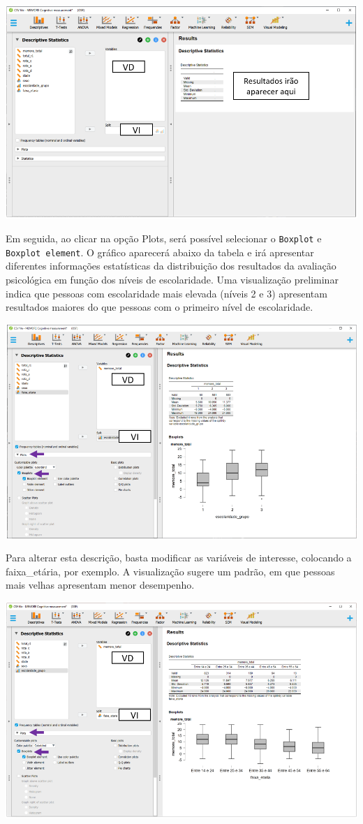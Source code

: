 \documentclass[
]{book}
\begin{document}
\includegraphics{./img/cap_anova_two_way_descriptives2.png}

Em seguida, ao clicar na opção Plots, será possível selecionar o
\texttt{Boxplot} e \texttt{Boxplot\ element}. O gráfico aparecerá abaixo
da tabela e irá apresentar diferentes informações estatísticas da
distribuição dos resultados da avaliação psicológica em função dos
níveis de escolaridade. Uma visualização preliminar indica que pessoas
com escolaridade mais elevada (níveis 2 e 3) apresentam resultados
maiores do que pessoas com o primeiro nível de escolaridade.

\includegraphics{./img/cap_anova_two_way_plot.png}

Para alterar esta descrição, basta modificar as variáveis de interesse,
colocando a faixa\_etária, por exemplo. A visualização sugere um padrão,
em que pessoas mais velhas apresentam menor desempenho.

\includegraphics{./img/cap_anova_two_way_plot1.png}
\end{document}
